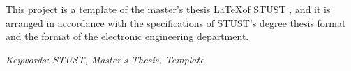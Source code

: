 \renewcommand{\abstractname}{Abstract}
\clearpage
{}
\begin{engabstract} 

\n	This project is a template of the master's thesis \LaTeX of STUST , and it is arranged in accordance with the specifications of STUST's degree thesis format and the format of the electronic engineering department.

	\hbox{}
	\it{Keywords: STUST, Master's Thesis, Template}

\end{engabstract}